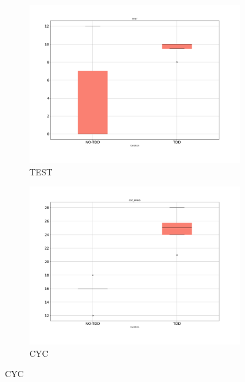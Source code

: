 \begin{figure}[htbp]
    \begin{subfigure}{0.5\textwidth}
        \includegraphics[width=\linewidth]{figures/box_plots/task1/TEST.png}
        \caption{TEST}
        \label{bp_task1_test}
    \end{subfigure}\hfil
    \begin{subfigure}{0.5\textwidth}
        \includegraphics[width=\linewidth]{figures/box_plots/task1/CYC.png}
        \caption{CYC}
        \label{bp_task1_cyc}
    \end{subfigure}

    \medskip


\end{figure}
